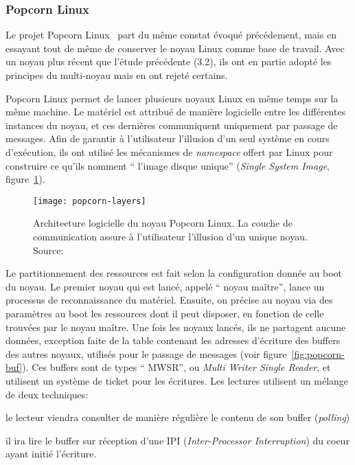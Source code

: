       
    \subsubsection{Popcorn Linux}

      Le projet Popcorn Linux~\citep{barbalacepopcorn} part du même constat
      évoqué précédement, mais en essayant tout de même de conserver le noyau
      Linux comme base de travail. Avec un noyau plus récent que l'étude
      précédente (3.2), ils ont en partie adopté les principes du multi-noyau
      mais en ont rejeté certains.

      Popcorn Linux permet de lancer plusieurs noyaux Linux en même temps sur la
      même machine. Le matériel est attribué de manière logicielle entre les
      différentes instances du noyau, et ces dernières communiquent uniquement
      par passage de messages. Afin de garantir à l’utilisateur l’illusion d’un
      seul système en cours d'exécution, ils ont utilisé les mécanismes de
      \textit{namespace} offert par Linux pour construire ce qu’ils nomment ``
      l’image disque unique'' (\textit{Single System Image},
      figure~\ref{fig:popcorn-layers}).

      \begin{figure}[h]
        \centering
        \texttt{[image: popcorn-layers]}
        \caption{Architecture logicielle du noyau Popcorn Linux. La couche de
          communication assure à l'utilisateur l'illusion d'un unique noyau.
          Source:~\citeauthor{barbalacepopcorn}}
        \label{fig:popcorn-layers}
      \end{figure}

      Le partitionnement des ressources est fait selon la configuration donnée
      au boot du noyau. Le premier noyau qui est lancé, appelé `` noyau
      maître'', lance un processus de reconnaissance du matériel. Ensuite, on
      précise au noyau via des paramètres au boot les ressources dont il peut
      disposer, en fonction de celle trouvées par le noyau maître. Une fois les
      noyaux lancés, ils ne partagent aucune données, exception faite de la
      table contenant les adresses d’écriture des buffers des autres noyaux,
      utilisés pour le passage de messages (voir
      figure~\ref{fig:popcorn-buf}). Ces buffers sont de types `` MWSR'', ou
      \textit{Multi Writer Single Reader}, et utilisent un système de ticket
      pour les écritures. Les lectures utilisent un mélange de deux
      techniques:\benumline \item le lecteur viendra consulter de manière
      régulière le contenu de son buffer (\textit{polling}) \item il ira lire le
      buffer sur réception d’une IPI (\textit{Inter-Processor Interruption}) du
      coeur ayant initié l’écriture\eenumline.

